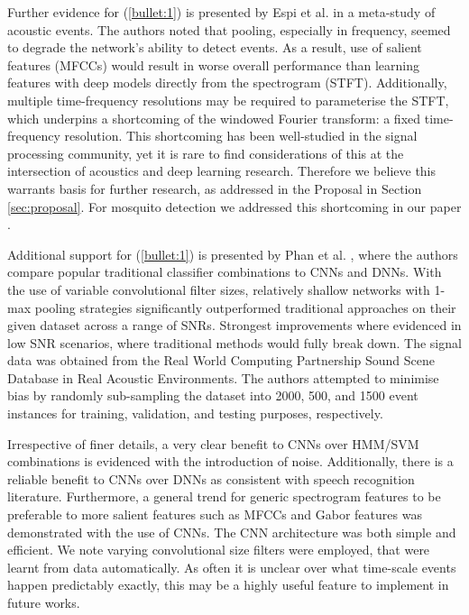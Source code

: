 \documentclass[12pt]{llncs}
\begin{document}
Further evidence for (\ref{bullet:1}) is presented by Espi et al. \cite{espi2015exploiting} in a meta-study of acoustic events. The authors noted that pooling, especially in frequency, seemed to degrade the network's ability to detect events. As a result, use of salient features (MFCCs) would result in worse overall performance than learning features with deep models directly from the spectrogram (STFT). Additionally, multiple time-frequency resolutions may be required to parameterise the STFT, which underpins a shortcoming of the windowed Fourier transform: a fixed time-frequency resolution. This shortcoming has been well-studied in the signal processing community, yet it is rare to find considerations of this at the intersection of acoustics and deep learning research. Therefore we believe this warrants basis for further research, as addressed in the Proposal in Section \ref{sec:proposal}. For mosquito detection we addressed this shortcoming in our paper \cite[Section 2.2]{kiskin2017mosquito}.


Additional support for (\ref{bullet:1}) is presented by Phan et al. \cite{phan2016robust}, where the authors compare popular traditional classifier combinations to CNNs and DNNs. 
With the use of variable convolutional filter sizes, relatively shallow networks with  1-max pooling strategies significantly outperformed traditional approaches on their given dataset across a range of SNRs. Strongest improvements where evidenced in low SNR scenarios, where traditional methods would fully break down. The signal data was obtained from the Real World Computing Partnership Sound Scene Database in Real Acoustic Environments. The authors attempted to minimise bias by randomly sub-sampling the dataset into  2000, 500, and 1500 event instances for training, validation, and testing purposes, respectively. 

Irrespective of finer details, a very clear benefit to CNNs over HMM/SVM combinations is evidenced with the introduction of noise. Additionally, there is a reliable benefit to CNNs over DNNs as consistent with speech recognition literature. Furthermore, a general trend for generic spectrogram features to be preferable to more salient features such as MFCCs and Gabor features was demonstrated with the use of CNNs. The CNN architecture was both simple and efficient. We note varying convolutional size filters were employed, that were learnt from data automatically. As often it is unclear over what time-scale events happen predictably exactly, this may be a highly useful feature to implement in future works.
\end{document}
